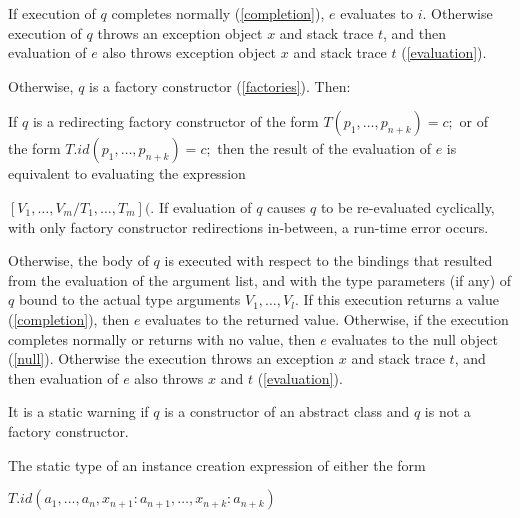 \documentclass{article}
\begin{document}
If execution of $q$ completes normally (\ref{completion}), $e$ evaluates to $i$.
Otherwise execution of $q$ throws an exception object $x$ and stack trace $t$,
and then evaluation of $e$ also throws exception object $x$ and stack trace $t$
(\ref{evaluation}).

\LMHash{}
Otherwise, $q$ is a factory constructor (\ref{factories}).
Then:

\LMHash{}
If $q$ is a redirecting factory constructor of the form $T(p_1, \ldots, p_{n+k}) = c;$ or of the form $T.id(p_1, \ldots, p_{n+k}) = c;$ then the result of the evaluation of $e$ is equivalent to evaluating the expression

$[V_1, \ldots, V_m/T_1, \ldots, T_m]($.
If evaluation of $q$ causes $q$ to be re-evaluated cyclically, with only factory constructor redirections in-between, a run-time error occurs.

\LMHash{}
Otherwise, the body of $q$ is executed with respect to the bindings that resulted from the evaluation of the argument list, and with the type parameters (if any) of $q$ bound to the actual type arguments $V_1, \ldots, V_l$.
If this execution returns a value (\ref{completion}),
then $e$ evaluates to the returned value.
Otherwise, if the execution completes normally or returns with no value,
then $e$ evaluates to the null object (\ref{null}).
Otherwise the execution throws an exception $x$ and stack trace $t$,
and then evaluation of $e$ also throws $x$ and $t$ (\ref{evaluation}).

\LMHash{}
It is a static warning if $q$ is a constructor of an abstract class and $q$ is not a factory constructor.



\LMHash{}
The static type of an instance creation expression of either the form

\NEW{} $T.id(a_1, \ldots , a_n, x_{n+1}: a_{n+1}, \ldots , x_{n+k}: a_{n+k})$
\end{document}

